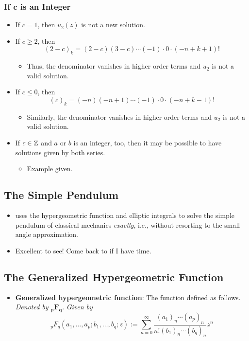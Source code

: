 \documentclass[../finalProject.tex]{subfiles}
\begin{document}
\subsubsection{If \texorpdfstring{$\bm{c}$}{TEXT} is an Integer}
\begin{itemize}
    \item If $c=1$, then $u_2(z)$ is not a new solution.
    \item If $c\geq 2$, then
    \begin{equation*}
        (2-c)_k = (2-c)(3-c)\cdots(-1)\cdot 0\cdot(-n+k+1)!
    \end{equation*}
    \begin{itemize}
        \item Thus, the denominator vanishes in higher order terms and $u_2$ is not a valid solution.
    \end{itemize}
    \item If $c\leq 0$, then
    \begin{equation*}
        (c)_k = (-n)(-n+1)\cdots(-1)\cdot 0\cdot(-n+k-1)!
    \end{equation*}
    \begin{itemize}
        \item Similarly, the denominator vanishes in higher order terms and $u_2$ is not a valid solution.
    \end{itemize}
    \item If $c\in\mathbb{Z}$ and $a$ or $b$ is an integer, too, then it may be possible to have solutions given by both series.
    \begin{itemize}
        \item Example given.
    \end{itemize}
\end{itemize}


\subsection{The Simple Pendulum}
\begin{itemize}
    \item \textcite{bib:Seaborn} uses the hypergeometric function and elliptic integrals to solve the simple pendulum of classical mechanics \emph{exactly}, i.e., without resorting to the small angle approximation.
    \item Excellent to see! Come back to if I have time.
\end{itemize}


\subsection{The Generalized Hypergeometric Function}
\begin{itemize}
    \item \textbf{Generalized hypergeometric function}: The function defined as follows. \emph{Denoted by} $\bm{{}_pF_q}$. \emph{Given by}
    \begin{equation*}
        {}_pF_q(a_1,\dots,a_p;b_1,\dots,b_q;z) := \sum_{n=0}^\infty\frac{(a_1)_n\cdots(a_p)_n}{n!(b_1)_n\cdots(b_q)_n}z^n
    \end{equation*}
\end{itemize}
\end{document}
